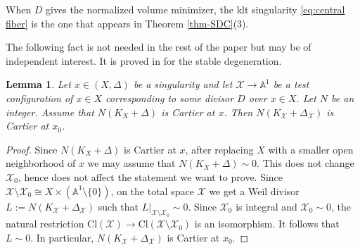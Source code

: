 \documentclass[12pt]{amsart}
\newtheorem{lem}[prop]{Lemma}
\theoremstyle{definition}
\newcommand{\bA}{\mathbb{A}}
\newcommand{\scX}{\mathscr{X}}
\newcommand{\Cl}{\mathrm{Cl}}
\numberwithin{equation}{section}
\begin{document}
When $D$ gives the normalized volume minimizer, the klt singularity \eqref{eq:central fiber} is the one that appears in Theorem \ref{thm-SDC}(3).

The following fact is not needed in the rest of the paper but may be of independent interest. It is proved in \cite[Proposition 4.1]{NO-symp} for the stable degeneration. 

\begin{lem}
Let $x\in (X,\Delta)$ be a singularity and let $\scX\to \bA^1$ be a test configuration of $x\in X$ corresponding to some divisor $D$ over $x\in X$. Let $N$ be an integer. Assume that $N(K_X+\Delta)$ is Cartier at $x$. Then $N(K_{\scX}+\Delta_{\scX})$ is Cartier at $x_0$. 
\end{lem}

\begin{proof}
Since $N(K_X+\Delta)$ is Cartier at $x$, after replacing $X$ with a smaller open neighborhood of $x$ we may assume that $N(K_X+\Delta)\sim 0$. This does not change $\scX_0$, hence does not affect the statement we want to prove. Since $\scX\setminus \scX_0 \cong X\times (\bA^1\setminus\{0\})$, on the total space $\scX$ we get a Weil divisor $L:=N(K_{\scX}+\Delta_{\scX})$ such that $L|_{\scX\setminus \scX_0} \sim 0$. Since $\scX_0$ is integral and $\scX_0\sim 0$, the natural restriction $\Cl(\scX)\to \Cl(\scX\setminus \scX_0)$ is an isomorphism. It follows that $L\sim 0$. In particular, $N(K_{\scX}+\Delta_{\scX})$ is Cartier at $x_0$.
\end{proof}
\end{document}
